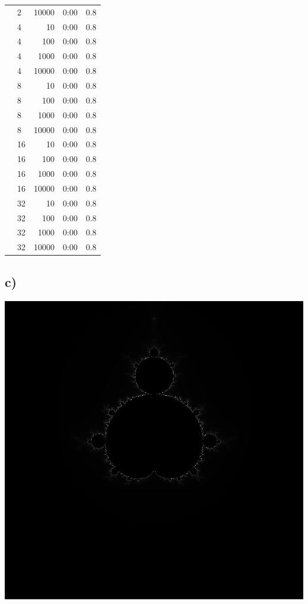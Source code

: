 \documentclass{article}
\begin{document}
\begin{tabular}{|l|l|r|r|r|}
		 & 2 & 10000 & 0:00 & 0.8 \\
		 & 4 & 10 & 0:00 & 0.8 \\
		 & 4 & 100 & 0:00 & 0.8 \\
		 & 4 & 1000 & 0:00 & 0.8 \\
		 & 4 & 10000 & 0:00 & 0.8 \\
		 & 8 & 10 & 0:00 & 0.8 \\
		 & 8 & 100 & 0:00 & 0.8 \\
		 & 8 & 1000 & 0:00 & 0.8 \\
		 & 8 & 10000 & 0:00 & 0.8 \\
		 & 16 & 10 & 0:00 & 0.8 \\
		 & 16 & 100 & 0:00 & 0.8 \\
		 & 16 & 1000 & 0:00 & 0.8 \\
		 & 16 & 10000 & 0:00 & 0.8 \\
		 & 32 & 10 & 0:00 & 0.8 \\
		 & 32 & 100 & 0:00 & 0.8 \\
		 & 32 & 1000 & 0:00 & 0.8 \\
		 & 32 & 10000 & 0:00 & 0.8 \\
		\hline
	\end{tabular}
        \subsection{c)}
	\begin{center}
		\includegraphics[width=0.6\linewidth]{Aufgaben-Ressourcen/normal-1000.jpg}	
	\end{center}
\end{document}
